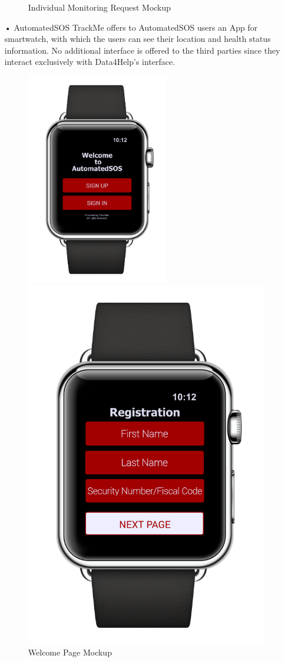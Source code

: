 \begin{enumerate}
\begin{figure}
\caption{Individual Monitoring Request Mockup}
\end{figure}
\newpage
\item[•]{\Large AutomatedSOS}
\medbreak
\noindent
TrackMe offers to AutomatedSOS users an App for smartwatch, with which the users can see their location and health status information. No additional interface is offered to the third parties since they interact exclusively with Data4Help's interface. 
\begin{figure}[H]
\begin{center}
        \begin{minipage}[c]{.40\textwidth}
        \centering
          \includegraphics[height=9.3cm]{Images/Mockups/AutomatedSOSMockup1.png}
	\caption{Welcome Page Mockup}
        \end{minipage}%
        \hspace{10mm}%
        \begin{minipage}[c]{.40\textwidth}
        \centering
          \includegraphics[height=9.3 cm]{Images/Mockups/AutomatedSOSMockup6.png}

\end{minipage}
\end{center}
\end{figure}
\end{enumerate}
